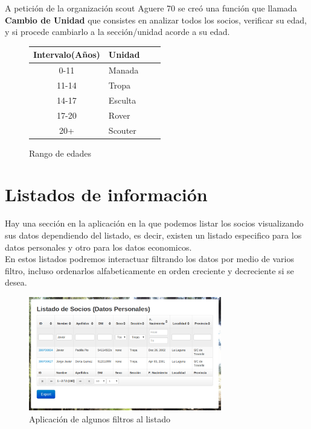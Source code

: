 A petición de la organización scout Aguere 70 se creó una función que llamada \textbf{Cambio de Unidad} que consistes en analizar todos los socios, verificar su edad, y si procede cambiarlo a la sección/unidad acorde a su edad.\\
\begin{figure}[H]
\begin{center}
\begin{tabular}{c|p{25mm}c|p{25mm}|} \hline 
\textbf{Intervalo(Años)} & \textbf{Unidad} \\ \hline
0-11 &
Manada
\\
\hline

11-14 &
Tropa
\\
\hline

14-17 &
Esculta
\\
\hline

17-20 &
Rover
\\
\hline

20+ & 
Scouter
\\
\hline
\end{tabular}
\caption{Rango de edades}
\end{center}
\end{figure}

\section{Listados de información}
\label{3:sec4}

Hay una sección en la aplicación en la que podemos listar los socios visualizando sus datos dependiendo del listado, es decir, existen un listado especifico para los datos personales y otro para los datos economicos.\\

En estos listados podremos interactuar filtrando los datos por medio de varios filtro, incluso ordenarlos alfabeticamente en orden creciente y decreciente si se desea.\\

\begin{figure}[H]
\begin{center}
\includegraphics[width=0.75\textwidth]{images/filtrado.jpg}
\caption{Aplicación de algunos filtros al listado}
\label{fig:ArbolBinario}
\end{center}
\end{figure}


